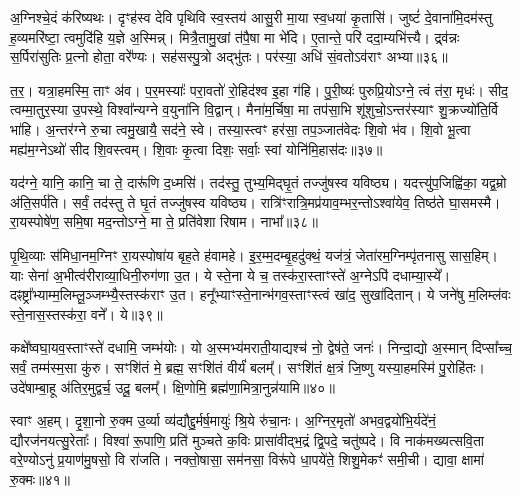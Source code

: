 अ॒ग्निश्चे॒दं क॑रिष्यथः। दृꣳह॑स्व देवि पृथिवि स्व॒स्तय॑ आसु॒री मा॒या स्व॒धया॑ कृ॒तासि॑। जुष्टं॑ दे॒वाना॑मि॒दम॑स्तु ह॒व्यमरि॑ष्टा॒ त्वमुदि॑हि य॒ज्ञे अ॒स्मिन्न्। मित्रै॒तामु॒खां त॑पै॒षा मा भे॑दि। ए॒तान्ते॒ परि॑ ददा॒म्यभि॑त्त्यै। द्र्व॑न्नः स॒र्पिरा॑सुतिः प्र॒त्नो होता॒ वरे᳚ण्यः। सह॑सस्पु॒त्रो अद्भु॑तः। पर॑स्या॒ अधि॑ सं॒वतो\-ऽव॑राꣳ अभ्या॥३६॥

त॒र॒। यत्रा॒हमस्मि॒ ताꣳ अ॑व। प॒र॒मस्याः᳚ परा॒वतो॑ रो॒हिद॑श्व इ॒हा ग॑हि। पु॒री॒ष्यः॑ पुरुप्रि॒यो\-ऽग्ने॒ त्वं त॑रा॒ मृधः॑। सीद॒ त्वम्मा॒तुर॒स्या उ॒पस्थे॒ विश्वा᳚न्यग्ने व॒युना॑नि वि॒द्वान्। मैना॑म॒र्चिषा॒ मा तप॑सा॒भि शू॑शुचो॒\-ऽन्तर॑स्याꣳ शु॒क्रज्यो॑ति॒र्वि भा॑हि। अ॒न्तर॑ग्ने रु॒चा त्वमु॒खायै॒ सद॑ने॒ स्वे। तस्या॒स्त्वꣳ हर॑सा॒ तप॒ञ्जात॑वेदः शि॒वो भ॑व। शि॒वो भू॒त्वा मह्य॑म॒ग्ने\-ऽथो॑ सीद शि॒वस्त्वम्। शि॒वाः कृ॒त्वा दिशः॒ सर्वाः॒ स्वां योनि॑मि॒हास॑दः॥३७॥

{\anuvakamend[{वी॒रय॒स्वा तप॑न्विꣳश॒तिश्च॑॥९॥}]}

यद॑ग्ने॒ यानि॒ कानि॒ चा ते॒ दारू॑णि द॒ध्मसि॑। तद॑स्तु॒ तुभ्य॒मिद्घृ॒तं तज्जु॑षस्व यविष्ठ्य। यदत्त्यु॑प॒जिह्वि॑का॒ यद्व॒म्रो अ॑ति॒सर्प॑ति। सर्वं॒ तद॑स्तु ते घृ॒तं तज्जु॑षस्व यविष्ठ्य। रात्रि॑ꣳरात्रि॒मप्र॑याव॒म्भर॒न्तो\-ऽश्वा॑येव॒ तिष्ठ॑ते घा॒समस्मै। रा॒यस्पोषे॑ण॒ समि॒षा मद॒न्तो\-ऽग्ने॒ मा ते॒ प्रति॑वेशा रिषाम। नाभा᳚॥३८॥

पृ॒थि॒व्याः स॑मिधा॒नम॒ग्निꣳ रा॒यस्पोषा॑य बृह॒ते ह॑वामहे। इ॒र॒म्म॒दम्बृ॒हदु॑क्थं॒ यज॑त्रं॒ जेता॑रम॒ग्निम्पृ॑तनासु सास॒हिम्। याः सेना॑ अ॒भीत्व॑रीराव्या॒धिनी॒रुग॑णा उ॒त। ये स्ते॒ना ये च॒ तस्क॑रा॒स्ताꣳस्ते॑ अ॒ग्ने\-ऽपि॑ दधाम्या॒स्ये᳚। दꣴष्ट्रा᳚भ्याम्म॒लिम्लू॒ञ्जम्भ्यै॒स्तस्क॑राꣳ उ॒त। हनू᳚भ्याꣳस्ते॒नान्भ॑गव॒स्ताꣳस्त्वं खा॑द॒ सुखा॑दितान्। ये जने॑षु म॒लिम्ल॑वः स्ते॒नास॒स्तस्क॑रा॒ वने᳚। ये॥३९॥

कक्षे᳚ष्वघा॒यव॒स्ताꣳस्ते॑ दधामि॒ जम्भ॑योः। यो अ॒स्मभ्य॑मराती॒याद्यश्च॑ नो॒ द्वेष॑ते॒ जनः॑। निन्दा॒द्यो अ॒स्मान् दिप्सा᳚च्च॒ सर्वं॒ तम्म॑स्म॒सा कु॑रु। सꣳशि॑तं मे॒ ब्रह्म॒ सꣳशि॑तं वीर्यं॑ बलम्᳚। सꣳशि॑तं क्ष॒त्रं जि॒ष्णु यस्या॒हमस्मि॑ पु॒रोहि॑तः। उदे॑षाम्बा॒हू अ॑तिर॒मुद्वर्च॒ उदू॒ बलम्᳚। क्षि॒णोमि॒ ब्रह्म॑णा॒मित्रा॒नुन्न॑यामि॥४०॥

स्वाꣳ अ॒हम्। दृ॒शा॒नो रु॒क्म उ॒र्व्या व्य॑द्यौद्दु॒र्मर्\mbox{}ष॒मायुः॑ श्रि॒ये रु॑चा॒नः। अ॒ग्निर॒मृतो॑ अभव॒द्वयो॑भि॒र्यदे॑नं॒ द्यौरज॑नयत्सु॒रेताः᳚। विश्वा॑ रू॒पाणि॒ प्रति॑ मुञ्चते क॒विः प्रासा॑वीद्भ॒द्रं द्वि॒पदे॒ चतु॑ष्पदे। वि नाक॑मख्यत्सवि॒ता वरे॒ण्यो\-ऽनु॑ प्र॒याण॑मु॒षसो॒ वि रा॑जति। नक्तो॒षासा॒ सम॑नसा॒ विरू॑पे धा॒पये॑ते॒ शिशु॒मेकꣳ॑ समी॒ची। द्यावा॒ क्षामा॑ रु॒क्मः॥४१॥

